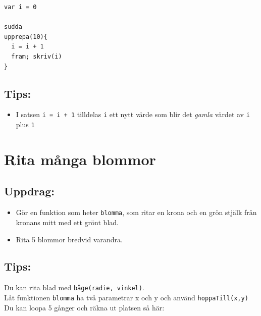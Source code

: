 \begin{lstlisting}[basicstyle={\ttfamily\fontsize{16}{19}\selectfont},numbers=none]
var i = 0

sudda
upprepa(10){
  i = i + 1
  fram; skriv(i)
}
\end{lstlisting}
        
\section*{\color{OliveGreen}Tips:}


\begin{itemize}

\item {I satsen \lstinline{i = i + 1} tilldelas \lstinline{i} ett nytt värde som blir det {\it gamla} värdet av \lstinline{i} plus \lstinline{1}}

\end{itemize}


\chapter{Rita många blommor}\section*{\color{BrickRed}Uppdrag:}


\begin{itemize}

\item {Gör en funktion som heter \lstinline{blomma}, som ritar en krona och en grön stjälk från kronans mitt med ett grönt blad.}
\item {Rita 5 blommor bredvid varandra.}

\end{itemize}



  
\section*{\color{OliveGreen}Tips:}
Du kan rita blad med \lstinline{båge(radie, vinkel)}. \\
Låt funktionen \lstinline{blomma} ha två parametrar x och y och använd \lstinline{hoppaTill(x,y)}\\
Du kan loopa 5 gånger och räkna ut platsen så här:


